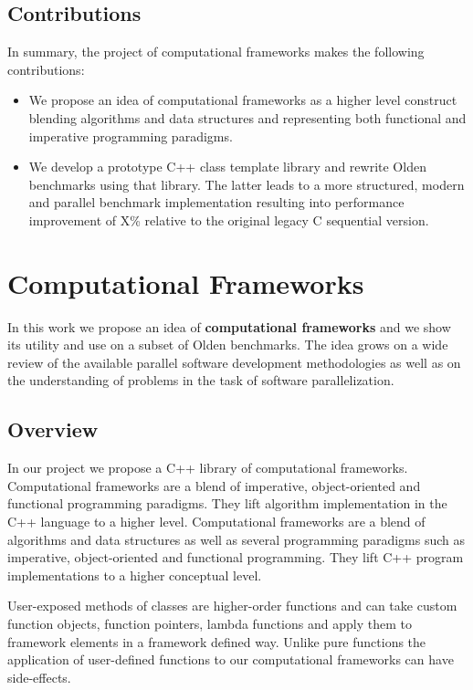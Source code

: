 \subsection{Contributions}
\label{computational_frameworks_contributions}
\quad In summary, the project of computational frameworks makes the following contributions:
%
\begin{itemize}
\renewcommand\labelitemi{$\vartriangleright$}
\renewcommand\labelitemii{$\bullet$}
\item We propose an idea of computational frameworks as a higher level construct blending algorithms and data structures and representing both functional and imperative programming paradigms.
\item We develop a prototype C++ class template library and rewrite Olden benchmarks using that library. The latter leads to a more structured, modern and parallel benchmark implementation resulting into performance improvement of X\% relative to the original legacy C sequential version.   
\end{itemize}

\section{Computational Frameworks}
\label{computational_frameworks_main}
\quad In this work we propose an idea of \textbf{computational frameworks} and we show its utility and use on a subset of Olden benchmarks. The idea grows on a wide review of the available parallel software development methodologies as well as on the understanding of problems in the task of software parallelization.  

\subsection{Overview}
\label{computational_frameworks_overview}
\quad In our project we propose a C++ library of computational frameworks. Computational frameworks are a blend of imperative, object-oriented and functional programming paradigms. They lift algorithm implementation in the C++ language to a higher level.
Computational frameworks are a blend of algorithms and data structures as well as several programming paradigms such as imperative, object-oriented and functional programming. They lift C++ program implementations to a higher conceptual level. 

User-exposed methods of classes are higher-order functions and can take custom function objects, function pointers, lambda functions and apply them to framework elements in a framework defined way. Unlike pure functions the application of user-defined functions to our computational frameworks can have side-effects.

